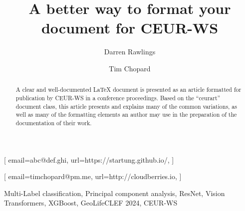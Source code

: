 


\title{A better way to format your document for CEUR-WS}

\author[1]{Darren Rawlings}[%
email=abc@def.ghi,
url=https://startung.github.io/,
]
\fnmark[1]
\address[1]{University of Groningen, Broerstraat 5, 9712 CP Groningen, Netherlands}

\author[]{Tim Chopard}[%
email=timchopard@pm.me,
url=http://cloudberries.io,
]
\fnmark[1]


\begin{abstract}
  A clear and well-documented \LaTeX{} document is presented as an
  article formatted for publication by CEUR-WS in a conference
  proceedings. Based on the ``ceurart'' document class, this article
  presents and explains many of the common variations, as well as many
  of the formatting elements an author may use in the preparation of
  the documentation of their work.
\end{abstract}

\begin{keywords}
  Multi-Label classification\sep
  Principal component analysis\sep
  ResNet\sep
  Vision Transformers\sep
  XGBoost\sep
  GeoLifeCLEF 2024\sep
  CEUR-WS
\end{keywords}

\maketitle